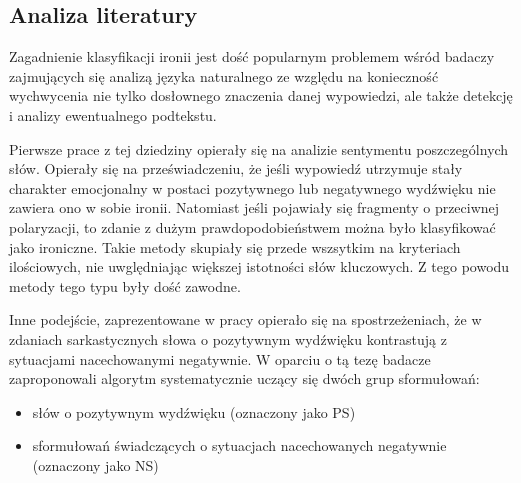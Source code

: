 \subsection{Analiza literatury}

Zagadnienie klasyfikacji ironii jest dość popularnym problemem wśród badaczy zajmujących się analizą języka naturalnego ze względu na konieczność wychwycenia nie tylko dosłownego znaczenia danej wypowiedzi, ale także detekcję i analizy ewentualnego podtekstu.


Pierwsze prace z tej dziedziny opierały się na analizie sentymentu poszczególnych słów. Opierały się na przeświadczeniu, że jeśli wypowiedź utrzymuje stały charakter emocjonalny w postaci pozytywnego lub negatywnego wydźwięku    nie zawiera ono w sobie ironii. Natomiast jeśli pojawiały się fragmenty o przeciwnej polaryzacji, to zdanie z dużym prawdopodobieństwem można było klasyfikować jako ironiczne. Takie metody skupiały się przede wszsytkim na kryteriach ilościowych, nie uwględniając większej istotności słów kluczowych. Z tego powodu metody tego typu były dość zawodne.





Inne podejście, zaprezentowane w pracy \cite{Riloff2013} opierało się na spostrzeżeniach, że w zdaniach sarkastycznych słowa o pozytywnym wydźwięku kontrastują z sytuacjami nacechowanymi negatywnie. W oparciu o tą tezę badacze zaproponowali algorytm systematycznie uczący się dwóch grup sformułowań:

\begin{itemize}
    \item słów o pozytywnym wydźwięku (oznaczony jako PS)
    \item sformułowań świadczących o sytuacjach nacechowanych negatywnie (oznaczony jako NS)
\end{itemize}


